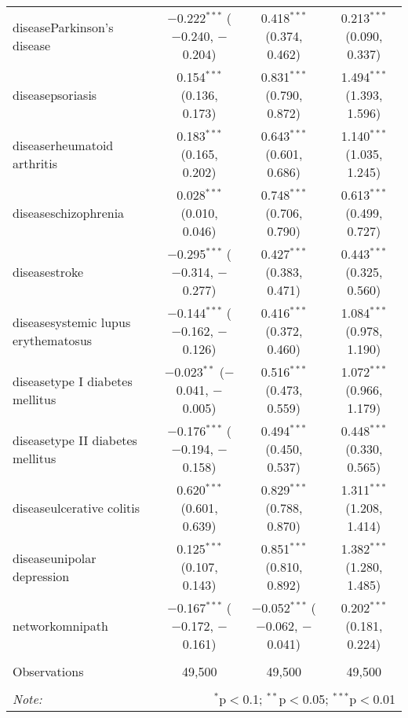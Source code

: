 \begin{table}[!htbp]
\begin{tabular}{@{\extracolsep{5pt}}lccc}
  diseaseParkinson's disease & $-$0.222$^{***}$ ($-$0.240, $-$0.204) & 0.418$^{***}$ (0.374, 0.462) & 0.213$^{***}$ (0.090, 0.337) \\ 
  diseasepsoriasis & 0.154$^{***}$ (0.136, 0.173) & 0.831$^{***}$ (0.790, 0.872) & 1.494$^{***}$ (1.393, 1.596) \\ 
  diseaserheumatoid arthritis & 0.183$^{***}$ (0.165, 0.202) & 0.643$^{***}$ (0.601, 0.686) & 1.140$^{***}$ (1.035, 1.245) \\ 
  diseaseschizophrenia & 0.028$^{***}$ (0.010, 0.046) & 0.748$^{***}$ (0.706, 0.790) & 0.613$^{***}$ (0.499, 0.727) \\ 
  diseasestroke & $-$0.295$^{***}$ ($-$0.314, $-$0.277) & 0.427$^{***}$ (0.383, 0.471) & 0.443$^{***}$ (0.325, 0.560) \\ 
  diseasesystemic lupus erythematosus & $-$0.144$^{***}$ ($-$0.162, $-$0.126) & 0.416$^{***}$ (0.372, 0.460) & 1.084$^{***}$ (0.978, 1.190) \\ 
  diseasetype I diabetes mellitus & $-$0.023$^{**}$ ($-$0.041, $-$0.005) & 0.516$^{***}$ (0.473, 0.559) & 1.072$^{***}$ (0.966, 1.179) \\ 
  diseasetype II diabetes mellitus & $-$0.176$^{***}$ ($-$0.194, $-$0.158) & 0.494$^{***}$ (0.450, 0.537) & 0.448$^{***}$ (0.330, 0.565) \\ 
  diseaseulcerative colitis & 0.620$^{***}$ (0.601, 0.639) & 0.829$^{***}$ (0.788, 0.870) & 1.311$^{***}$ (1.208, 1.414) \\ 
  diseaseunipolar depression & 0.125$^{***}$ (0.107, 0.143) & 0.851$^{***}$ (0.810, 0.892) & 1.382$^{***}$ (1.280, 1.485) \\ 
  networkomnipath & $-$0.167$^{***}$ ($-$0.172, $-$0.161) & $-$0.052$^{***}$ ($-$0.062, $-$0.041) & 0.202$^{***}$ (0.181, 0.224) \\ 
 \hline \\[-1.8ex] 
Observations & 49,500 & 49,500 & 49,500 \\ 
\hline 
\hline \\[-1.8ex] 
\textit{Note:}  & \multicolumn{3}{r}{$^{*}$p$<$0.1; $^{**}$p$<$0.05; $^{***}$p$<$0.01} \\ 
\end{tabular} 
\end{table} 

